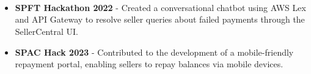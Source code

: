 \newcommand{\contributionItem}[2]{
    \textbf{#1} \\ {#2}
}

\newcommand{\contributionItemListStart}{
    \begin{itemize}[left=25pt, itemsep=0.3pt]
    
}

\newcommand{\contributionItemListEnd}{
    \end{itemize}
} 

\section{}

\contributionItem{}{
    \contributionItemListStart
        \item \textbf{SPFT Hackathon 2022} - Created a conversational chatbot using AWS Lex and API Gateway to resolve seller queries about failed payments through the SellerCentral UI.
        
         \item \textbf{SPAC Hack 2023} - Contributed to the development of a mobile-friendly repayment portal, enabling sellers to repay balances via mobile devices.
    \contributionItemListEnd}